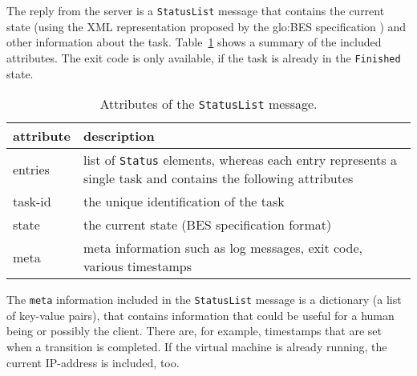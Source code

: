 The reply from  the server is a \texttt{StatusList}  message that contains
the  current   state  (using  the  XML  representation   proposed  by  the
\gls{glo:BES} specification  \cite{ogsa-bes}) and other  information about
the task. Table~\ref{tab:msg:status-list} shows  a summary of the included
attributes.  The  exit code is only  available, if the task  is already in
the \texttt{Finished} state.

\medskip
\begin{table}[ht]
  \centering
  \begin{tabular}{@{}lp{}@{}}\toprule
    attribute        & \multicolumn{1}{l}{description} \\ \midrule %
    entries          & list of \texttt{Status} elements, whereas each
                       entry represents a single task and contains
                       the following attributes \\
    task-id          & the unique identification of the task \\
    state            & the current state (BES specification format) \\
    meta             & meta information such as log messages, exit code, various timestamps \\
    \bottomrule
  \end{tabular}
  \caption{Attributes of the \texttt{StatusList} message.}
  \label{tab:msg:status-list}
\end{table}


The \texttt{meta} information  included in the \texttt{StatusList} message
is a dictionary (\ie a list of key-value pairs), that contains information
that could be useful for a human being or possibly the client.  There are,
for example,  timestamps that are set  when a transition  is completed. If
the  virtual  machine  is  already  running,  the  current  IP-address  is
included, too.


